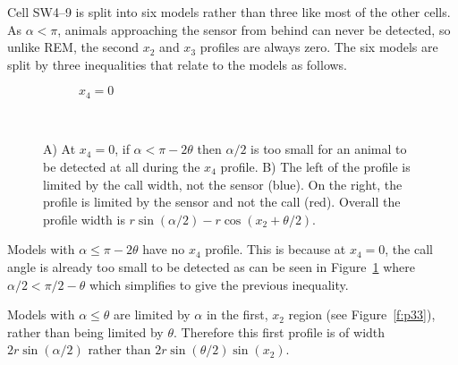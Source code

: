 Cell SW4--9 is split into six models rather than three like most of the other cells. As $\alpha < \pi$, animals approaching the sensor from behind can never be detected, so unlike REM, the second $x_2$ and $x_3$ profiles are always zero. The six models are split by three inequalities that relate to the models as follows.

\begin{figure}[t]
        \centering

        \begin{subfigure}[t]{0.4\textwidth}
                \centering
                \caption{$x_4=0$}
                \label{f:SW4--9nox4}
        \end{subfigure}
	~
        \begin{subfigure}[t]{0.4\textwidth}
                \centering
                \caption{}
                \label{f:SW4--9fig}
        \end{subfigure}
        
\caption{A) At $x_4 = 0$, if $\alpha < \pi - 2\theta$ then $\alpha/2$ is too small for an animal to be detected at all during the $x_4$ profile. B) The left of the profile is limited by the call width, not the sensor (blue). On the right, the profile is limited by the sensor and not the call (red). Overall the profile width is $r\sin(\alpha/2) - r\cos(x_2 + \theta/2)$.     }
\label{f:SW4--9}
\end{figure}

Models with $\alpha \le \pi - 2\theta$  have no $x_4$ profile. This is because at $x_4 = 0$, the call angle is already too small to be detected as can be seen in Figure~\ref{f:SW4--9nox4} where $\alpha/2 < \pi/2 - \theta$ which simplifies to give the previous inequality.

Models with $\alpha \le \theta$ are limited by $\alpha$ in the first, $x_2$ region (see Figure~\ref{f:p33}), rather than being limited by $\theta$. Therefore this first profile is of width $2r\sin(\alpha/2)$ rather than $2r\sin(\theta/2)\sin(x_2)$.

